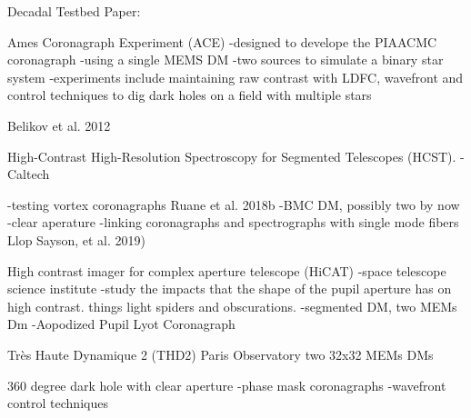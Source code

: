 Decadal Testbed Paper:

Ames Coronagraph Experiment (ACE)
-designed to develope the PIAACMC coronagraph
-using a single MEMS DM
-two sources to simulate a binary star system
-experiments include maintaining raw contrast with LDFC, wavefront and control techniques to dig dark holes on a field with multiple stars

Belikov et al. 2012

High-Contrast High-Resolution Spectroscopy for Segmented Telescopes (HCST).
-Caltech

-testing vortex coronagraphs Ruane et al. 2018b
-BMC DM, possibly two by now
-clear aperature
-linking coronagraphs and spectrographs with single mode fibers
Llop Sayson, et al. 2019)

High contrast imager for complex aperture telescope (HiCAT)
-space telescope science institute
-study the impacts that the shape of the pupil aperture has on high contrast. things light spiders and obscurations. 
-segmented DM, two MEMs Dm
-Aopodized Pupil Lyot Coronagraph

Très Haute Dynamique 2 (THD2)
Paris Observatory
two 32x32 MEMs DMs

360 degree dark hole with clear aperture
-phase mask coronagraphs
-wavefront control techniques